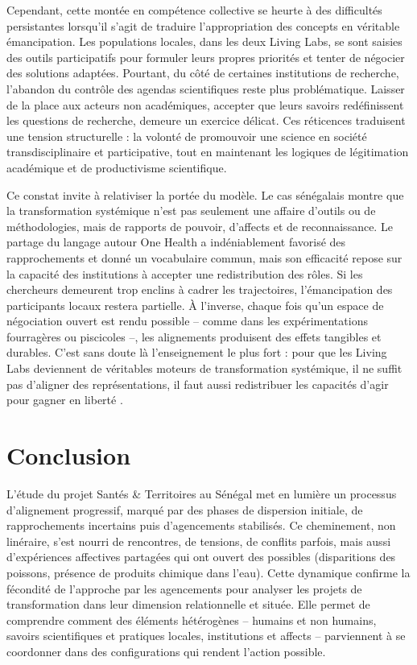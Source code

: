 \documentclass{article}
\begin{document}
Cependant, cette montée en compétence collective se heurte à des difficultés persistantes lorsqu’il s’agit de traduire l’appropriation des concepts en véritable émancipation. Les populations locales, dans les deux Living Labs, se sont saisies des outils participatifs pour formuler leurs propres priorités et tenter de  négocier des solutions adaptées. Pourtant, du côté de certaines institutions de recherche, l’abandon du contrôle des agendas scientifiques reste plus problématique. Laisser de la place aux acteurs non académiques, accepter que leurs savoirs redéfinissent les questions de recherche, demeure un exercice délicat. Ces réticences traduisent une tension structurelle : la volonté de promouvoir une science en société transdisciplinaire et participative, tout en maintenant les logiques de légitimation académique et de productivisme scientifique.

Ce constat invite à relativiser la portée du modèle. Le cas sénégalais montre que la transformation systémique n’est pas seulement une affaire d’outils ou de méthodologies, mais de rapports de pouvoir, d'affects et de reconnaissance. Le partage du langage autour One Health a indéniablement favorisé des rapprochements et donné un vocabulaire commun, mais son efficacité repose sur la capacité des institutions à accepter une redistribution des rôles. Si les chercheurs demeurent trop enclins à cadrer les trajectoires, l’émancipation des participants locaux restera partielle. À l’inverse, chaque fois qu’un espace de négociation ouvert est rendu possible -- comme dans les expérimentations fourragères ou piscicoles --, les alignements produisent des effets tangibles et durables. C’est sans doute là l’enseignement le plus fort : pour que les Living Labs deviennent de véritables moteurs de transformation systémique, il ne suffit pas d’aligner des représentations, il faut aussi redistribuer les capacités d’agir pour gagner en liberté \parencite{sen_development_1999}.

\section{Conclusion}

L’étude du projet Santés \& Territoires au Sénégal met en lumière un processus d’alignement progressif, marqué par des phases de dispersion initiale, de rapprochements incertains puis d’agencements stabilisés. Ce cheminement, non linéraire, s’est nourri de rencontres, de tensions, de conflits parfois, mais aussi d’expériences affectives partagées qui ont ouvert des possibles (disparitions des poissons, présence de produits chimique dans l'eau). Cette dynamique confirme la fécondité de l’approche par les agencements pour analyser les projets de transformation dans leur dimension relationnelle et située. Elle permet de comprendre comment des éléments hétérogènes -- humains et non humains, savoirs scientifiques et pratiques locales, institutions et affects -- parviennent à se coordonner dans des configurations qui rendent l’action possible.
\end{document}
